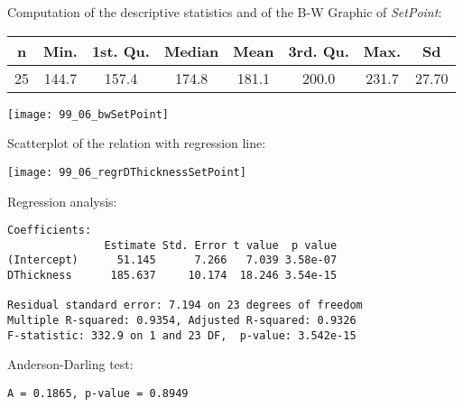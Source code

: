 \begin{frame}
  Computation of the descriptive statistics and of the B-W Graphic of \textit{SetPoint}:\\
  \vspace{.3cm}
  \begin{scriptsize}
    \begin{center}
      \begin{tabular}{|c|cccccc|c|}
        \hline
        \textbf{n} & \textbf{Min.} & \textbf{1st. Qu.} & \textbf{Median} & \textbf{Mean} & \textbf{3rd. Qu.} & \textbf{Max.} & \textbf{Sd}\\
        \hline
        25 & 144.7 & 157.4 & 174.8 & 181.1 & 200.0 & 231.7 & 27.70 \\
        \hline	
      \end{tabular}
    \end{center}
    \vspace{0.3cm}
    \begin{center}
      \texttt{[image: 99\_06\_bwSetPoint]}
    \end{center}
  \end{scriptsize}
\end{frame}

\begin{frame}
  Scatterplot of the relation with regression line:\\
  \vspace{.3cm}
  \begin{center}
    \texttt{[image: 99\_06\_regrDThicknessSetPoint]}
  \end{center}
\end{frame}

\begin{frame}[fragile]
  Regression analysis:\\
  \begin{small}
    \begin{verbatim}
Coefficients:
               Estimate Std. Error t value  p value    
(Intercept)      51.145      7.266   7.039 3.58e-07
DThickness      185.637     10.174  18.246 3.54e-15

Residual standard error: 7.194 on 23 degrees of freedom
Multiple R-squared: 0.9354,	Adjusted R-squared: 0.9326 
F-statistic: 332.9 on 1 and 23 DF,  p-value: 3.542e-15
    \end{verbatim}
  \end{small}
  Anderson-Darling test:\\
  \begin{small}
    \begin{verbatim}
A = 0.1865, p-value = 0.8949
    \end{verbatim}
  \end{small}
\end{frame}

